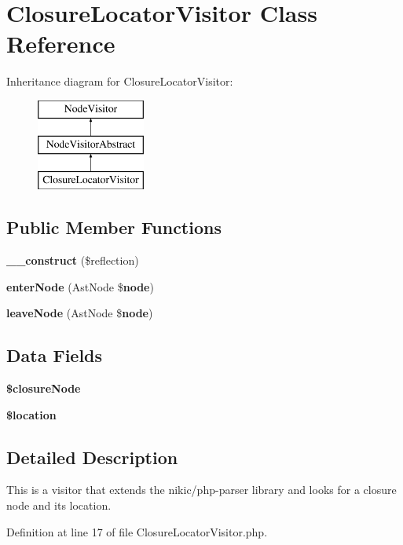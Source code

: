 \section{Closure\+Locator\+Visitor Class Reference}
\label{class_super_closure_1_1_analyzer_1_1_visitor_1_1_closure_locator_visitor}
Inheritance diagram for Closure\+Locator\+Visitor\+:\begin{figure}[H]
\begin{center}
\leavevmode
\includegraphics[height=3.000000cm]{class_super_closure_1_1_analyzer_1_1_visitor_1_1_closure_locator_visitor}
\end{center}
\end{figure}
\subsection*{Public Member Functions}
\begin{DoxyCompactItemize}
\item 
{\bf \+\_\+\+\_\+construct} (\$reflection)
\item 
{\bf enter\+Node} (Ast\+Node \${\bf node})
\item 
{\bf leave\+Node} (Ast\+Node \${\bf node})
\end{DoxyCompactItemize}
\subsection*{Data Fields}
\begin{DoxyCompactItemize}
\item 
{\bf \$closure\+Node}
\item 
{\bf \$location}
\end{DoxyCompactItemize}


\subsection{Detailed Description}
This is a visitor that extends the nikic/php-\/parser library and looks for a closure node and its location. 

Definition at line 17 of file Closure\+Locator\+Visitor.\+php.



